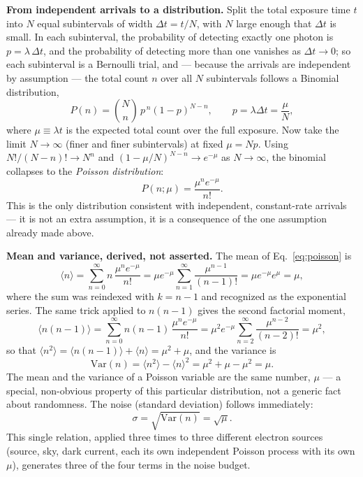 \documentclass[11pt]{article}
\begin{document}
\textbf{From independent arrivals to a distribution.} Split the total exposure time $t$ into $N$ equal
subintervals of width $\Delta t = t/N$, with $N$ large enough that $\Delta t$ is small. In each
subinterval, the probability of detecting exactly one photon is $p = \lambda\,\Delta t$, and the
probability of detecting more than one vanishes as $\Delta t\to0$; so each subinterval is a Bernoulli
trial, and --- because the arrivals are independent by assumption --- the total count $n$ over all $N$
subintervals follows a Binomial distribution,
\begin{equation}
P(n) = \binom{N}{n}\,p^{\,n}(1-p)^{N-n}, \qquad p = \lambda\Delta t = \frac{\mu}{N},
\end{equation}
where $\mu \equiv \lambda t$ is the expected total count over the full exposure. Now take the limit
$N\to\infty$ (finer and finer subintervals) at fixed $\mu = Np$. Using
$N!/(N-n)! \to N^n$ and $(1-\mu/N)^{N-n}\to e^{-\mu}$ as $N\to\infty$, the binomial collapses to the
\emph{Poisson distribution}:
\begin{equation}
P(n;\mu) = \frac{\mu^{n}e^{-\mu}}{n!}.
\label{eq:poisson}
\end{equation}
This is the only distribution consistent with independent, constant-rate arrivals --- it is not an
extra assumption, it is a consequence of the one assumption already made above.

\textbf{Mean and variance, derived, not asserted.} The mean of Eq.~\ref{eq:poisson} is
\begin{equation}
\langle n\rangle = \sum_{n=0}^{\infty} n\,\frac{\mu^n e^{-\mu}}{n!}
= \mu e^{-\mu}\sum_{n=1}^{\infty}\frac{\mu^{n-1}}{(n-1)!}
= \mu e^{-\mu} e^{\mu} = \mu,
\end{equation}
where the sum was reindexed with $k=n-1$ and recognized as the exponential series. The same trick
applied to $n(n-1)$ gives the second factorial moment,
\begin{equation}
\langle n(n-1)\rangle = \sum_{n=0}^{\infty} n(n-1)\,\frac{\mu^n e^{-\mu}}{n!}
= \mu^2 e^{-\mu}\sum_{n=2}^{\infty}\frac{\mu^{n-2}}{(n-2)!} = \mu^2,
\end{equation}
so that $\langle n^2\rangle = \langle n(n-1)\rangle + \langle n\rangle = \mu^2+\mu$, and the variance is
\begin{equation}
\mathrm{Var}(n) = \langle n^2\rangle - \langle n\rangle^2 = \mu^2+\mu-\mu^2 = \mu.
\end{equation}
The mean and the variance of a Poisson variable are the same number, $\mu$ --- a special, non-obvious
property of this particular distribution, not a generic fact about randomness. The noise (standard
deviation) follows immediately:
\begin{equation}
\sigma = \sqrt{\mathrm{Var}(n)} = \sqrt{\mu}.
\end{equation}
This single relation, applied three times to three different electron sources (source, sky, dark
current, each its own independent Poisson process with its own $\mu$), generates three of the four
terms in the noise budget.
\end{document}
